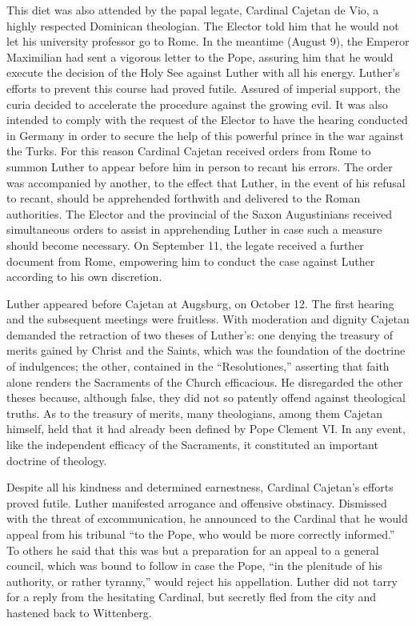 This diet was also attended by the papal legate, Cardinal Cajetan
de Vio, a highly respected Dominican theologian. The Elector told
him that he would not let his university professor go to Rome. In
the meantime (August 9), the Emperor Maximilian had sent a
vigorous letter to the Pope, assuring him that he would execute the
decision of the Holy See against Luther with all his energy. Luther’s
efforts to prevent this course had proved futile. Assured of imperial support,
the curia decided to accelerate the procedure against
the growing evil. It was also intended to comply with the request of
the Elector to have the hearing conducted in Germany in order to
secure the help of this powerful prince in the war against the Turks.
For this reason Cardinal Cajetan received orders from Rome to
summon Luther to appear before him in person to recant his errors.
The order was accompanied by another, to the effect that Luther,
in the event of his refusal to recant, should be apprehended forthwith and delivered to the Roman authorities. The Elector and the
provincial of the Saxon Augustinians received simultaneous orders
to assist in apprehending Luther in case such a measure should become necessary. On September 11, the legate received a further
document from Rome, empowering him to conduct the case against
Luther according to his own discretion.

Luther appeared before Cajetan at Augsburg, on October 12.
The first hearing and the subsequent meetings were fruitless. With
moderation and dignity Cajetan demanded the retraction of two
theses of Luther’s: one denying the treasury of merits gained by
Christ and the Saints, which was the foundation of the doctrine of indulgences;
the other, contained in the ``Resolutiones,'' asserting
that faith alone renders the Sacraments of the Church efficacious. He
disregarded the other theses because, although false, they did not
so patently offend against theological truths. As to the treasury of
merits, many theologians, among them Cajetan himself, held that it
had already been defined by Pope Clement VI. In any event, like the
independent efficacy of the Sacraments, it constituted an important
doctrine of theology.

Despite all his kindness and determined earnestness, Cardinal
Cajetan’s efforts proved futile. Luther manifested arrogance and offensive
obstinacy. Dismissed with the threat of excommunication,
he announced to the Cardinal that he would appeal from his tribunal
“to the Pope, who would be more correctly informed.” To others
he said that this was but a preparation for an appeal to a general
council, which was bound to follow in case the Pope, “in the plenitude
of his authority, or rather tyranny,” would reject his appellation. Luther
did not tarry for a reply from the hesitating Cardinal,
but secretly fled from the city and hastened back to Wittenberg.


